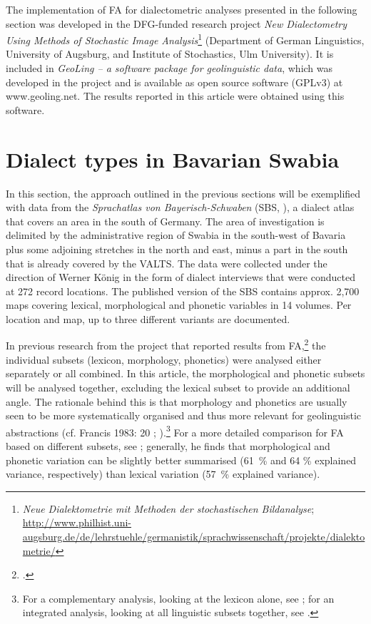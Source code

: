 \documentclass[output=paper]{LSP/langsci}
\begin{document}
The implementation of FA for dialectometric analyses presented in the following section was developed in the DFG-funded research project \textit{New Dialectometry Using Methods of Stochastic Image Analysis}\footnote{   \textit{Neue Dialektometrie mit Methoden der stochastischen Bildanalyse}; \\
\url{http://www.philhist.uni-augsburg.de/de/lehrstuehle/germanistik/sprachwissenschaft/projekte/dialektometrie/}} (Department of German Linguistics, University of Augsburg, and Institute of Stochastics, Ulm University). It is included in \textit{GeoLing – a software package for geolinguistic data}, which was developed in the project and is available as open source software (GPLv3) at www.geoling.net. The results reported in this article were obtained using this software.

\section{Dialect types in Bavarian Swabia}

In this section, the approach outlined in the previous sections will be exemplified with data from the \textit{Sprachatlas von Bayerisch-Schwaben} (SBS, \citealt{konig_sprachatlas_1996}), a dialect atlas that covers an area in the south of Germany. The area of investigation is delimited by the administrative region of Swabia in the south-west of Bavaria plus some adjoining stretches in the north and east, minus a part in the south that is already covered by the VALTS. The data were collected under the direction of Werner König in the form of dialect interviews that were conducted at 272 record locations. The published version of the SBS contains approx. 2,700 maps covering lexical, morphological and phonetic variables in 14 volumes. Per location and map, up to three different variants are documented.

In previous research from the project that reported results from FA,\footnote{\cite{pickl_probabilistische_2013,pickl_verdichtungen_2013,buhler_dialektraume_2014,proll_raumvariation_2015,proll_raumvariation_2015}.} the individual subsets (lexicon, morphology, phonetics) were analysed either separately or all combined. In this article, the morphological and phonetic subsets will be analysed together, excluding the lexical subset to provide an additional angle. The rationale behind this is that morphology and phonetics are usually seen to be more systematically organised and thus more relevant for geolinguistic abstractions (cf. Francis 1983: 20 %
; \citealt[41, 119]{labov_atlas_2006-1}).\footnote{For a complementary analysis, looking at the lexicon alone, see \citet{pickl_probabilistische_2013,pickl_verdichtungen_2013}; for an integrated analysis, looking at all linguistic subsets together, see \citet{proll_raumvariation_2015}.} For a more detailed comparison for FA based on different subsets, see \citet[84--132]{proll_raumvariation_2015}; generally, he finds that morphological and phonetic variation can be slightly better summarised (61~\% and 64 \% explained variance, respectively) than lexical variation (57~\% explained variance).
\end{document}
